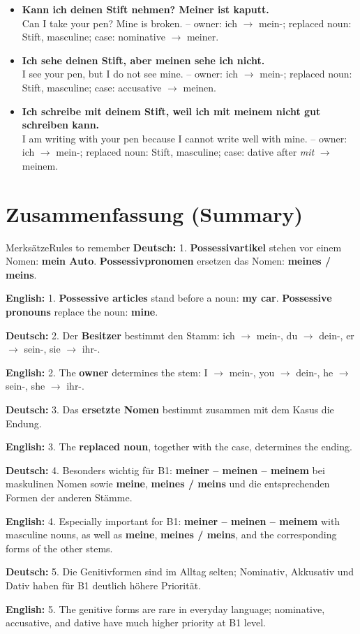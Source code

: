 \documentclass[a4paper,11pt]{article}
\newcommand{\GermanText}[1]{\textbf{Deutsch: }#1\par}
\newcommand{\EnglishText}[1]{{\small\color{SoftGray}\textbf{English: }#1\par}}
\newcommand{\ExampleItem}[2]{\item \textbf{#1}\\{\small\color{SoftGray}#2}}
\begin{document}
        \begin{exbox}
            \begin{itemize}
                \ExampleItem{Kann ich deinen Stift nehmen? Meiner ist kaputt.}{Can I take your pen? Mine is broken. -- owner: ich $\rightarrow$ mein-; replaced noun: Stift, masculine; case: nominative $\rightarrow$ meiner.}
                \ExampleItem{Ich sehe deinen Stift, aber meinen sehe ich nicht.}{I see your pen, but I do not see mine. -- owner: ich $\rightarrow$ mein-; replaced noun: Stift, masculine; case: accusative $\rightarrow$ meinen.}
                \ExampleItem{Ich schreibe mit deinem Stift, weil ich mit meinem nicht gut schreiben kann.}{I am writing with your pen because I cannot write well with mine. -- owner: ich $\rightarrow$ mein-; replaced noun: Stift, masculine; case: dative after \textit{mit} $\rightarrow$ meinem.}
            \end{itemize}
        \end{exbox}

    \section{Zusammenfassung \textnormal{(Summary)}}

        \begin{grammarentry}{Merksätze}{Rules to remember}
            \GermanText{1. \textbf{Possessivartikel} stehen vor einem Nomen: \textbf{mein Auto}. \textbf{Possessivpronomen} ersetzen das Nomen: \textbf{meines / meins}.}
            \EnglishText{1. \textbf{Possessive articles} stand before a noun: \textbf{my car}. \textbf{Possessive pronouns} replace the noun: \textbf{mine}.}

            \GermanText{2. Der \textbf{Besitzer} bestimmt den Stamm: ich $\rightarrow$ mein-, du $\rightarrow$ dein-, er $\rightarrow$ sein-, sie $\rightarrow$ ihr-.}
            \EnglishText{2. The \textbf{owner} determines the stem: I $\rightarrow$ mein-, you $\rightarrow$ dein-, he $\rightarrow$ sein-, she $\rightarrow$ ihr-.}

            \GermanText{3. Das \textbf{ersetzte Nomen} bestimmt zusammen mit dem Kasus die Endung.}
            \EnglishText{3. The \textbf{replaced noun}, together with the case, determines the ending.}

            \GermanText{4. Besonders wichtig für B1: \textbf{meiner -- meinen -- meinem} bei maskulinen Nomen sowie \textbf{meine}, \textbf{meines / meins} und die entsprechenden Formen der anderen Stämme.}
            \EnglishText{4. Especially important for B1: \textbf{meiner -- meinen -- meinem} with masculine nouns, as well as \textbf{meine}, \textbf{meines / meins}, and the corresponding forms of the other stems.}

            \GermanText{5. Die Genitivformen sind im Alltag selten; Nominativ, Akkusativ und Dativ haben für B1 deutlich höhere Priorität.}
            \EnglishText{5. The genitive forms are rare in everyday language; nominative, accusative, and dative have much higher priority at B1 level.}
        \end{grammarentry}
\end{document}
